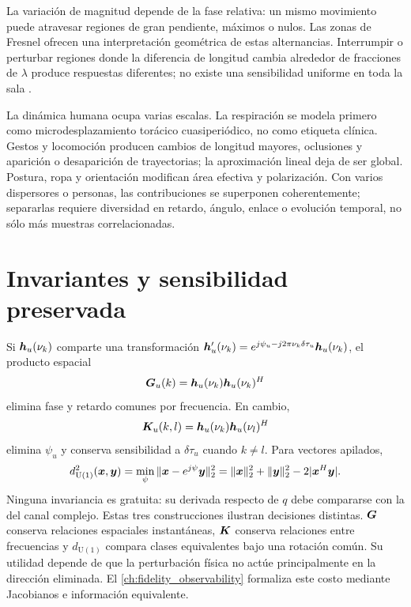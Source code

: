 La variación de magnitud depende de la fase relativa: un mismo movimiento puede
atravesar regiones de gran pendiente, máximos o nulos. Las zonas de Fresnel
ofrecen una interpretación geométrica de estas alternancias. Interrumpir o
perturbar regiones donde la diferencia de longitud cambia alrededor de fracciones
de $\lambda$ produce respuestas diferentes; no existe una sensibilidad uniforme
en toda la sala \citep{Mosleh2022BreatheSmart,Zhu2024Survey}.

La dinámica humana ocupa varias escalas. La respiración se modela primero como
microdesplazamiento torácico cuasiperiódico, no como etiqueta clínica. Gestos y
locomoción producen cambios de longitud mayores, oclusiones y aparición o
desaparición de trayectorias; la aproximación lineal deja de ser global. Postura,
ropa y orientación modifican área efectiva y polarización. Con varios dispersores
o personas, las contribuciones se superponen coherentemente; separarlas requiere
diversidad en retardo, ángulo, enlace o evolución temporal, no sólo más muestras
correlacionadas.

\section{Invariantes y sensibilidad preservada}
\label{sec:phase_invariants}

Si $\bm{h}_u(\nu_k)$ comparte una transformación $\bm{h}'_u(\nu_k)=e^{j\psi_u-j2\pi\nu_k\delta\tau_u}\bm{h}_u(\nu_k)$, el producto espacial
\begin{equation}
\bm{G}_u(k)=\bm{h}_u(\nu_k)\bm{h}_u(\nu_k)^H
\label{eq:spatial_gram_invariant}
\end{equation}
elimina fase y retardo comunes por frecuencia. En cambio,
\begin{equation}
\bm{K}_u(k,l)=\bm{h}_u(\nu_k)\bm{h}_u(\nu_l)^H
\label{eq:cross_frequency_invariant}
\end{equation}
elimina $\psi_u$ y conserva sensibilidad a $\delta\tau_u$ cuando $k\ne l$. Para vectores apilados,
\begin{equation}
d_{\mathrm U(1)}^2(\bm{x},\bm{y})=
\min_\psi\|\bm{x}-e^{j\psi}\bm{y}\|_2^2
=\|\bm{x}\|_2^2+\|\bm{y}\|_2^2-2|\bm{x}^H\bm{y}|.
\label{eq:phase_quotient_distance}
\end{equation}
Ninguna invariancia es gratuita: su derivada respecto de $q$ debe compararse con la del canal complejo.
Estas tres construcciones ilustran decisiones distintas. $\bm{G}$ conserva
relaciones espaciales instantáneas, $\bm{K}$ conserva relaciones entre frecuencias
y $d_{\mathrm U(1)}$ compara clases equivalentes bajo una rotación común. Su
utilidad depende de que la perturbación física no actúe principalmente en la
dirección eliminada. El \cref{ch:fidelity_observability} formaliza este costo
mediante Jacobianos e información equivalente.

